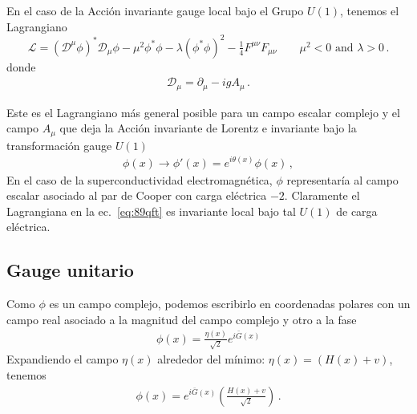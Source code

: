\begin{frame}
En el caso de la Acción invariante gauge local bajo el Grupo $U(1)$, tenemos el Lagrangiano 
\begin{equation}
  \label{eq:89qft}
  \mathcal{L}=\left(\mathcal{D}^\mu\phi\right)^*\mathcal{D}_\mu\phi-\mu^2\phi^*\phi-\lambda\left(\phi^*\phi\right)^2-\tfrac{1}{4}F^{\mu\nu}F_{\mu\nu}
  \qquad 
  \mu^2\lt 0\text{ and } \lambda\gt 0\,.
\end{equation}
donde
\begin{align}
  \mathcal{D}_{\mu}=\partial_{\mu}-ig A_{\mu}\,.
\end{align}

Este es el Lagrangiano más general posible para un campo escalar complejo y el campo $A_\mu$ que deja la Acción invariante de Lorentz e invariante bajo la transformación gauge $U(1)$
\begin{align}
\label{eq:sqedgu}
  \phi(x)\to \phi'(x)=e^{i\theta(x)} \phi(x)\,,
\end{align}
En el caso de la superconductividad  electromagnética, $\phi$ representaría al campo escalar asociado al par de Cooper con carga eléctrica $-2$. Claramente el Lagrangiana en la ec.~\eqref{eq:89qft} es invariante local bajo tal $U(1)$ de carga eléctrica. 


\subsection{Gauge unitario}
Como $\phi$ es un campo complejo, podemos escribirlo en coordenadas polares con un campo real asociado a la magnitud del campo complejo y otro a la fase
\begin{align*}
  \phi(x)=\frac{\eta(x)}{\sqrt{2}}e^{i\bar{G}(x)}
\end{align*}
Expandiendo el campo $\eta(x)$ alrededor del mínimo: $\eta(x)=(H(x)+v)$, tenemos
\begin{align*}
    \phi(x)=e^{i\bar{G}(x)}\left(\frac{H(x)+v}{\sqrt{2}}\right)\,.
\end{align*}



\end{frame}
